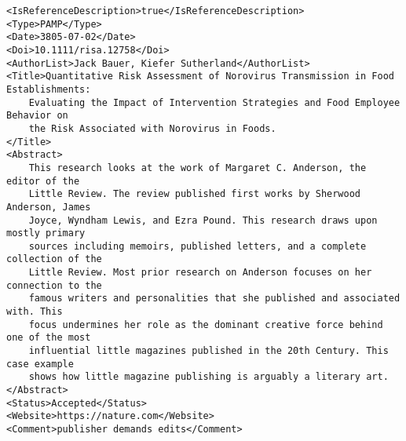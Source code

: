 \documentclass[a4paper]{report}
\begin{document}
\begin{lstlisting}[language=RAKIP, caption={Example of Reference}]
<IsReferenceDescription>true</IsReferenceDescription>
<Type>PAMP</Type>
<Date>3805-07-02</Date>
<Doi>10.1111/risa.12758</Doi>
<AuthorList>Jack Bauer, Kiefer Sutherland</AuthorList>
<Title>Quantitative Risk Assessment of Norovirus Transmission in Food Establishments:
    Evaluating the Impact of Intervention Strategies and Food Employee Behavior on
    the Risk Associated with Norovirus in Foods.
</Title>
<Abstract>
    This research looks at the work of Margaret C. Anderson, the editor of the
    Little Review. The review published first works by Sherwood Anderson, James
    Joyce, Wyndham Lewis, and Ezra Pound. This research draws upon mostly primary
    sources including memoirs, published letters, and a complete collection of the
    Little Review. Most prior research on Anderson focuses on her connection to the
    famous writers and personalities that she published and associated with. This
    focus undermines her role as the dominant creative force behind one of the most
    influential little magazines published in the 20th Century. This case example
    shows how little magazine publishing is arguably a literary art.
</Abstract>
<Status>Accepted</Status>
<Website>https://nature.com</Website>
<Comment>publisher demands edits</Comment>
\end{lstlisting}
\end{document}
